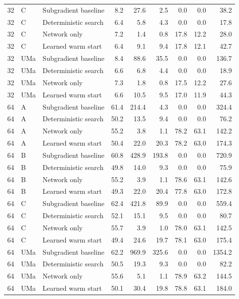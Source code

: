 \documentclass[10pt,letterpaper]{article}
\begin{document}
\begin{longtable}{rllrrrrrr}
32 & C & Subgradient baseline & 8.2 & 27.6 & 2.5 & 0.0 & 0.0 & 38.2\\
32 & C & Deterministic search & 6.4 & 5.8 & 4.3 & 0.0 & 0.0 & 17.8\\
32 & C & Network only & 7.2 & 1.4 & 0.8 & 17.8 & 12.2 & 28.0\\
32 & C & Learned warm start & 6.4 & 9.1 & 9.4 & 17.8 & 12.1 & 42.7\\
32 & UMa & Subgradient baseline & 8.4 & 88.6 & 35.5 & 0.0 & 0.0 & 136.7\\
32 & UMa & Deterministic search & 6.6 & 6.8 & 4.4 & 0.0 & 0.0 & 18.9\\
32 & UMa & Network only & 7.3 & 1.8 & 0.8 & 17.5 & 12.2 & 27.6\\
32 & UMa & Learned warm start & 6.6 & 10.5 & 9.5 & 17.0 & 11.9 & 44.3\\
64 & A & Subgradient baseline & 61.4 & 214.4 & 4.3 & 0.0 & 0.0 & 324.4\\
64 & A & Deterministic search & 50.2 & 13.5 & 9.4 & 0.0 & 0.0 & 76.2\\
64 & A & Network only & 55.2 & 3.8 & 1.1 & 78.2 & 63.1 & 142.2\\
64 & A & Learned warm start & 50.4 & 22.0 & 20.3 & 78.2 & 63.0 & 174.3\\
64 & B & Subgradient baseline & 60.8 & 428.9 & 193.8 & 0.0 & 0.0 & 720.9\\
64 & B & Deterministic search & 49.8 & 14.0 & 9.3 & 0.0 & 0.0 & 75.9\\
64 & B & Network only & 55.2 & 3.9 & 1.1 & 78.6 & 63.1 & 142.6\\
64 & B & Learned warm start & 49.3 & 22.0 & 20.4 & 77.8 & 63.0 & 172.8\\
64 & C & Subgradient baseline & 62.4 & 421.8 & 89.9 & 0.0 & 0.0 & 559.4\\
64 & C & Deterministic search & 52.1 & 15.1 & 9.5 & 0.0 & 0.0 & 80.7\\
64 & C & Network only & 55.7 & 3.9 & 1.0 & 78.0 & 63.1 & 142.5\\
64 & C & Learned warm start & 49.4 & 24.6 & 19.7 & 78.1 & 63.0 & 175.4\\
64 & UMa & Subgradient baseline & 62.2 & 969.9 & 325.6 & 0.0 & 0.0 & 1354.2\\
64 & UMa & Deterministic search & 50.5 & 19.3 & 9.3 & 0.0 & 0.0 & 82.2\\
64 & UMa & Network only & 55.6 & 5.1 & 1.1 & 78.9 & 63.2 & 144.5\\
64 & UMa & Learned warm start & 50.1 & 30.4 & 19.8 & 78.8 & 63.1 & 184.0\\\end{longtable}\endgroup
\end{document}
